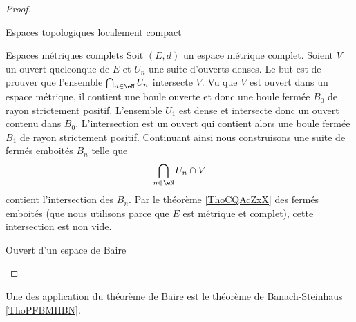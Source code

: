 \begin{proof}
    \begin{subproof}
    \item[Espaces topologiques localement compact]
        \item[Espaces métriques complets]
            Soit \( (E,d)\) un espace métrique complet. Soient \( V\) un ouvert quelconque de \( E\) et \( U_n\) une suite d'ouverts denses. Le but est de prouver que l'ensemble \( \bigcap_{n\in \eN}U_n\) intersecte \( V\). Vu que \( V\) est ouvert dans un espace métrique, il contient une boule ouverte et donc une boule fermée \( B_0\) de rayon strictement positif. L'ensemble \( U_1\) est dense et intersecte donc un ouvert contenu dans \( B_0\). L'intersection est un ouvert qui contient alors une boule fermée \( B_1\) de rayon strictement positif. Continuant ainsi nous construisons une suite de fermés emboités \( B_n\) telle que
            \begin{equation}
                \bigcap_{n\in \eN}U_n\cap V
            \end{equation}
            contient l'intersection des \( B_n\). Par le théorème \ref{ThoCQAcZxX} des fermés emboités (que nous utilisons parce que \( E\) est métrique et complet), cette intersection est non vide.
        \item[Ouvert d'un espace de Baire]
    \end{subproof}
\end{proof}

Une des application du théorème de Baire est le théorème de Banach-Steinhaus \ref{ThoPFBMHBN}.
